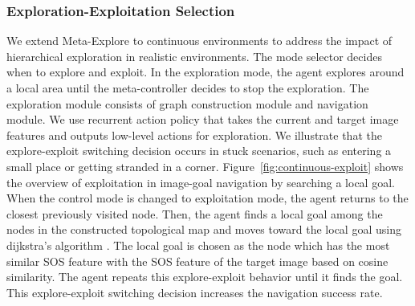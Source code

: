 \documentclass[10pt,twocolumn,letterpaper]{article}
\begin{document}
\subsubsection{Exploration-Exploitation Selection}
We extend Meta-Explore to continuous environments to address the impact of hierarchical exploration in realistic environments. The mode selector decides when to explore and exploit. In the exploration mode, the agent explores around a local area until the meta-controller decides to stop the exploration. The exploration module consists of graph construction module and navigation module. We use recurrent action policy that takes the current and target image features and outputs low-level actions for exploration. We illustrate that the explore-exploit switching decision occurs in stuck scenarios, such as entering a small place or getting stranded in a corner. Figure~\ref{fig:continuous-exploit} shows the overview of exploitation in image-goal navigation by searching a local goal. When the control mode is changed to exploitation mode, the agent returns to the closest previously visited node. Then, the agent finds a local goal among the nodes in the constructed topological map and moves toward the local goal using dijkstra's algorithm \cite{dijkstra1959note}. The local goal is chosen as the node which has the most similar SOS feature with the SOS feature of the target image based on cosine similarity. The agent repeats this explore-exploit behavior until it finds the goal. This explore-exploit switching decision increases the navigation success rate.
\end{document}
